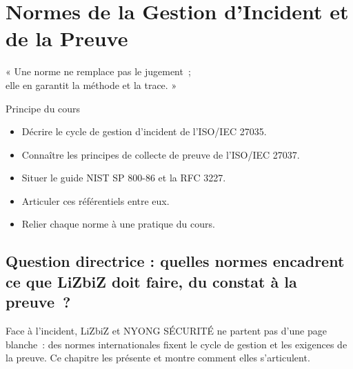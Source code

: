 
\chapter{Normes de la Gestion d'Incident et de la Preuve}
\label{chap:normes}

\epigraph{%
    « Une norme ne remplace pas le jugement~;\\
    elle en garantit la méthode et la trace. »%
}{Principe du cours}


\begin{boxobjectifs}
\begin{itemize}
    \item Décrire le cycle de gestion d'incident de l'ISO/IEC 27035.
    \item Connaître les principes de collecte de preuve de l'ISO/IEC 27037.
    \item Situer le guide NIST SP 800-86 et la RFC 3227.
    \item Articuler ces référentiels entre eux.
    \item Relier chaque norme à une pratique du cours.
\end{itemize}
\end{boxobjectifs}

\bigskip

\section*{Question directrice : quelles normes encadrent ce que LiZbiZ doit faire, du constat à la preuve~?}

Face à l'incident, LiZbiZ et NYONG SÉCURITÉ ne partent pas d'une page
blanche~: des normes internationales fixent le cycle de gestion et les
exigences de la preuve. Ce chapitre les présente et montre comment elles
s'articulent.

